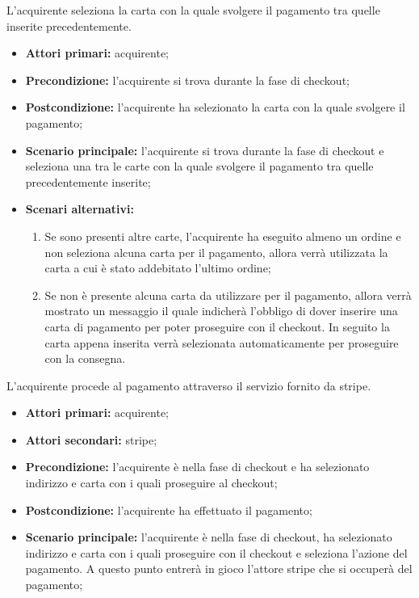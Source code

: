 L'acquirente seleziona la carta con la quale svolgere il pagamento tra quelle inserite precedentemente.
\begin{itemize}
    \item \textbf{Attori primari:} acquirente;
    \item \textbf{Precondizione:} l'acquirente si trova durante la fase di checkout;
    \item \textbf{Postcondizione:} l'acquirente ha selezionato la carta con la quale svolgere il pagamento;
    \item \textbf{Scenario principale:} l'acquirente si trova durante la fase di checkout e seleziona una tra le carte con la quale svolgere il pagamento tra quelle precedentemente inserite;
    \item \textbf{Scenari alternativi:}
    \begin{enumerate}[label=\lett]
        \item Se sono presenti altre carte, l'acquirente ha eseguito almeno un ordine e non seleziona alcuna carta per il pagamento, allora verrà utilizzata la carta a cui è stato addebitato l'ultimo ordine;
        \item Se non è presente alcuna carta da utilizzare per il pagamento, allora verrà mostrato un messaggio il quale indicherà l'obbligo di dover inserire una carta di pagamento per poter proseguire con il checkout. In seguito la carta appena inserita verrà selezionata automaticamente per proseguire con la consegna.
    \end{enumerate}
\end{itemize}

L'acquirente procede al pagamento attraverso il servizio fornito da stripe.
\begin{itemize}
    \item \textbf{Attori primari:} acquirente;
    \item \textbf{Attori secondari:} stripe;
    \item \textbf{Precondizione:} l'acquirente è nella fase di checkout e ha selezionato indirizzo e carta con i quali proseguire al checkout;
    \item \textbf{Postcondizione:} l'acquirente ha effettuato il pagamento;
    \item \textbf{Scenario principale:} l'acquirente è nella fase di checkout, ha selezionato indirizzo e carta con i quali proseguire con il checkout e seleziona l'azione del pagamento. A questo punto entrerà in gioco l'attore stripe che si occuperà del pagamento;
\end{itemize}

